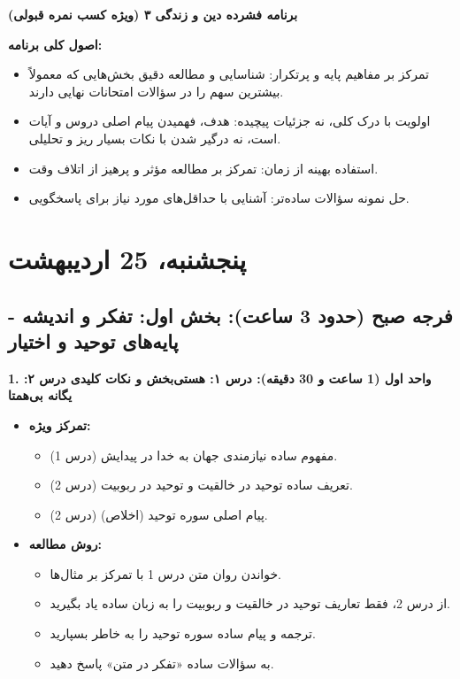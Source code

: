 \documentclass[12pt,a4paper]{article}
\newcommand{\sectionbreak}{\noindent\hrulefill\par\vspace{0.5em}}
\begin{document}
\begin{center}
    \bfseries\Huge برنامه فشرده دین و زندگی ۳ (ویژه کسب نمره قبولی)
\end{center}
\vspace{1em}

\textbf{اصول کلی برنامه:}
\begin{itemize}
    \item تمرکز بر مفاهیم پایه و پرتکرار: شناسایی و مطالعه دقیق بخش‌هایی که معمولاً بیشترین سهم را در سؤالات امتحانات نهایی دارند.
    \item اولویت با درک کلی، نه جزئیات پیچیده: هدف، فهمیدن پیام اصلی دروس و آیات است، نه درگیر شدن با نکات بسیار ریز و تحلیلی.
    \item استفاده بهینه از زمان: تمرکز بر مطالعه مؤثر و پرهیز از اتلاف وقت.
    \item حل نمونه سؤالات ساده‌تر: آشنایی با حداقل‌های مورد نیاز برای پاسخگویی.
\end{itemize}

\sectionbreak
\vspace{1em}

\section*{پنجشنبه، 25 اردیبهشت}

\subsection*{فرجه صبح (حدود 3 ساعت): بخش اول: تفکر و اندیشه - پایه‌های توحید و اختیار}

\textbf{1. واحد اول (1 ساعت و 30 دقیقه): درس ۱: هستی‌بخش و نکات کلیدی درس ۲: یگانه بی‌همتا}
\begin{itemize}
    \item \textbf{تمرکز ویژه:}
    \begin{itemize}
        \item مفهوم ساده نیازمندی جهان به خدا در پیدایش (درس 1).
        \item تعریف ساده توحید در خالقیت و توحید در ربوبیت (درس 2).
        \item پیام اصلی سوره توحید (اخلاص) (درس 2).
    \end{itemize}
    \item \textbf{روش مطالعه:}
    \begin{itemize}
        \item خواندن روان متن درس 1 با تمرکز بر مثال‌ها.
        \item از درس 2، فقط تعاریف توحید در خالقیت و ربوبیت را به زبان ساده یاد بگیرید.
        \item ترجمه و پیام ساده سوره توحید را به خاطر بسپارید.
        \item به سؤالات ساده «تفکر در متن» پاسخ دهید.
    \end{itemize}
\end{itemize}
\end{document}
